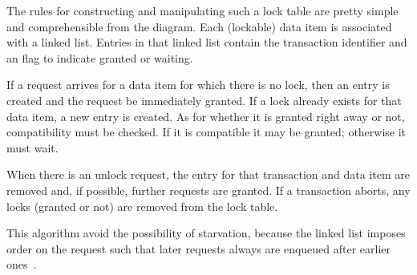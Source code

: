 The rules for constructing and manipulating such a lock table are pretty simple and comprehensible from the diagram. Each (lockable) data item is associated with a linked list. Entries in that linked list contain the transaction identifier and an flag to indicate granted or waiting.

If a request arrives for a data item for which there is no lock, then an entry is created and the request be immediately granted. If a lock already exists for that data item, a new entry is created. As for whether it is granted right away or not, compatibility must be checked. If it is compatible it may be granted; otherwise it must wait. 

When there is an unlock request, the entry for that transaction and data item are removed and, if possible, further requests are granted. If a transaction aborts, any locks (granted or not) are removed from the lock table.

This algorithm avoid the possibility of starvation, because the linked list imposes order on the request such that later requests always are enqueued after earlier ones~\cite{dsc}.





